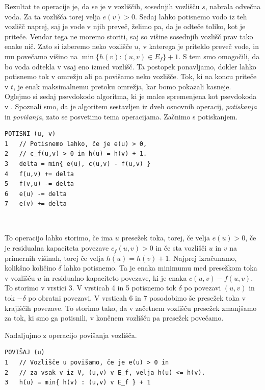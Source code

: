\documentclass[mat1]{fmfdelo}
\begin{document}
Rezultat te operacije je, da se je v vozliščih, sosednjih vozlišču $s$, nabrala odvečna voda. Za ta vozlišča torej velja $e(v) > 0$. Sedaj lahko potisnemo vodo iz teh vozlišč naprej, saj je vode v njih preveč, želimo pa, da je odteče toliko, kot je priteče. Vendar tega ne moremo storiti, saj so višine sosednjih vozlišč prav tako enake nič. Zato si izberemo neko vozlišče $u$, v katerega je priteklo preveč vode, in mu povečamo višino na $\min\{h(v) : (u,v) \in E_f\} + 1$. S tem smo omogočili, da bo voda odtekla v vsaj eno izmed vozlišč. Ta postopek ponavljamo, dokler lahko potisnemo tok v omrežju ali pa povišamo neko vozlišče. Tok, ki na koncu priteče v $t$, je enak maksimalnemu pretoku omrežja, kar bomo pokazali kasneje.\\

Oglejmo si sedaj psevdokodo algoritma, ki je malce spremenjena kot psevdokoda v \cite{clrs}. Spoznali smo, da je algoritem sestavljen iz dveh osnovnih operacij, \textit{potiskanja} in \textit{povišanja}, zato se posvetimo tema operacijama. Začnimo s potiskanjem.\\

\begin{verbatim}
POTISNI (u, v)
1   // Potisnemo lahko, če je e(u) > 0,
2   // c_f(u,v) > 0 in h(u) = h(v) + 1.
3   delta = min{ e(u), c(u,v) - f(u,v) }
4   f(u,v) += delta
5   f(v,u) -= delta
6   e(u) -= delta
7   e(v) += delta
\end{verbatim}~

To operacijo lahko storimo, če ima $u$ presežek toka, torej, če velja $e(u) > 0$, če je residualna kapaciteta povezave $c_f(u,v) > 0$ in če sta vozlišči $u$ in $v$ na primernih višinah, torej če velja $h(u) = h(v) + 1$. Najprej izračunamo, kolikšno količino $\delta$ lahko potisnemo. Ta je enaka minimumu med presežkom toka v vozlišču $u$ in residualno kapaciteto povezave, ki je enaka $c(u,v) - f(u,v)$. To storimo v vrstici 3. V vrsticah 4 in 5 potisnemo tok $\delta$ po povezavi $(u,v)$ in tok
$-\delta$ po obratni povezavi. V vrsticah 6 in 7 posodobimo še presežek toka v krajiščih povezave. To storimo tako, da v začetnem vozlišču presežek zmanjšamo za tok, ki smo ga potisnili, v končnem vozlišču pa presežek povečamo.

Nadaljujmo z operacijo povišanja vozlišča.\\

\begin{verbatim}
POVIŠAJ (u)
1   // Vozlišče u povišamo, če je e(u) > 0 in
2   // za vsak v iz V, (u,v) v E_f, velja h(u) <= h(v).
3   h(u) = min{ h(v) : (u,v) v E_f } + 1
\end{verbatim}~
\end{document}
